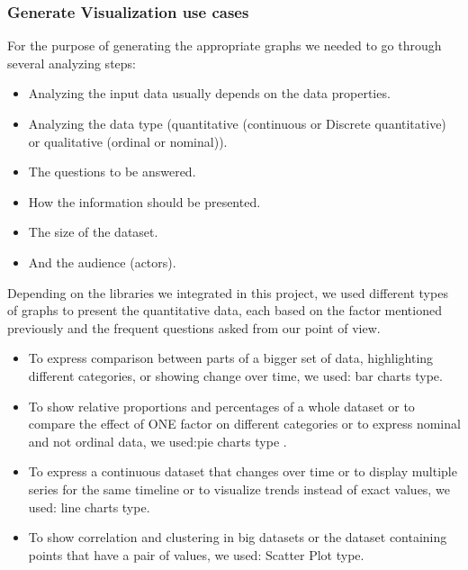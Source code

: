 \subsubsection*{Generate Visualization use cases}
For the purpose of generating the appropriate graphs we needed to go through several analyzing steps:
\begin{itemize}
\renewcommand{\labelitemi}{$\bullet$}
\item Analyzing the input data usually depends on the data properties.
\item Analyzing the data type (quantitative (continuous or Discrete quantitative) or qualitative (ordinal or nominal)).
\item The questions to be answered.
\item How the information should be presented.
\item The size of the dataset.
\item And the audience (actors).
\end{itemize}

\bigbreak
Depending on the libraries we integrated in this project, we used different types of graphs to present the quantitative data, each based on the factor mentioned previously and the frequent questions asked from our point of view.
\begin{itemize}
  \renewcommand{\labelitemi}{$\bullet$}
  \item To express comparison between parts of a bigger set of data, highlighting different categories, or showing change over time, we used: bar charts type.
  \item To show relative proportions and percentages of a whole dataset or to compare the effect of ONE factor on different categories or to express nominal and not ordinal data, we used:pie charts type . 
  \item To express a continuous dataset that changes over time or to display multiple series for the same timeline or to visualize trends instead of exact values, we used: line charts type.
\item To show correlation and clustering in big datasets or the dataset containing points that have a pair of values, we used: Scatter Plot type.
\end{itemize}



